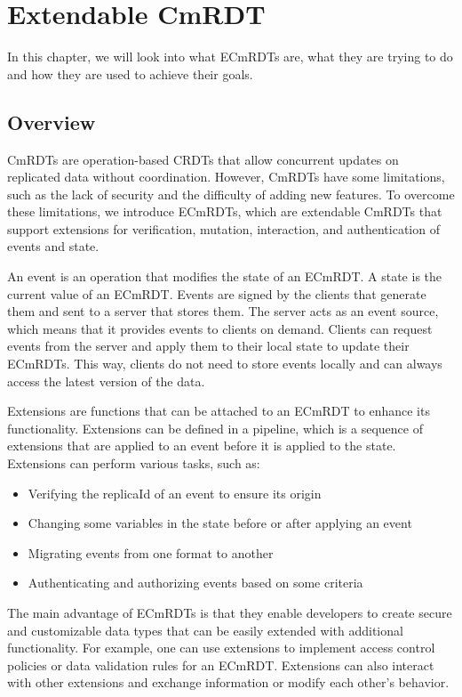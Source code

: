\documentclass[
	ngerman,
	ruledheaders=section,   %
	class=report,		    %
	thesis={type=bachelor}, %
	accentcolor=9c,			%
	custommargins=true,    %
	marginpar=false,        %
	parskip=half-,          %
	fontsize=11pt,          %
]{tudapub}
\begin{document}
\chapter{Extendable CmRDT}
In this chapter, we will look into what ECmRDTs are, what they are trying to do and how they are used to achieve their goals.

\section{Overview}
CmRDTs are operation-based CRDTs that allow concurrent updates on replicated data without coordination. However, CmRDTs have some limitations, such as the lack of security and the difficulty of adding new features. To overcome these limitations, we introduce ECmRDTs, which are extendable CmRDTs that support extensions for verification, mutation, interaction, and authentication of events and state.

An event is an operation that modifies the state of an ECmRDT. A state is the current value of an ECmRDT. Events are signed by the clients that generate them and sent to a server that stores them. The server acts as an event source, which means that it provides events to clients on demand. Clients can request events from the server and apply them to their local state to update their ECmRDTs. This way, clients do not need to store events locally and can always access the latest version of the data.

Extensions are functions that can be attached to an ECmRDT to enhance its functionality. Extensions can be defined in a pipeline, which is a sequence of extensions that are applied to an event before it is applied to the state. Extensions can perform various tasks, such as:

\begin{itemize}
  \item Verifying the replicaId of an event to ensure its origin
  \item Changing some variables in the state before or after applying an event
  \item Migrating events from one format to another
  \item Authenticating and authorizing events based on some criteria
\end{itemize}

The main advantage of ECmRDTs is that they enable developers to create secure and customizable data types that can be easily extended with additional functionality. For example, one can use extensions to implement access control policies or data validation rules for an ECmRDT. Extensions can also interact with other extensions and exchange information or modify each other’s behavior.
\end{document}
